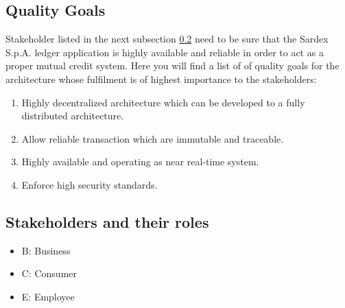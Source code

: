\subsection{Quality Goals}\label{_quality_goals}

Stakeholder listed in the next subsection \ref{_stakeholders} need to be sure that the Sardex S.p.A. ledger application is highly available and reliable in order to act as a proper mutual credit system. Here you will find a list of of quality goals for the architecture whose fulfilment is of highest importance to the stakeholders:

\begin{enumerate}
	\item Highly decentralized architecture which can be developed to a fully distributed architecture.
	\item Allow reliable transaction which are immutable and traceable.
	\item Highly available and operating as near real-time system.
	\item Enforce high security standards.
\end{enumerate} 

\subsection{Stakeholders and their roles}\label{_stakeholders}

\begin{itemize}
	\item B:  Business
	\item C:  Consumer
	\item E:  Employee	
\end{itemize}

